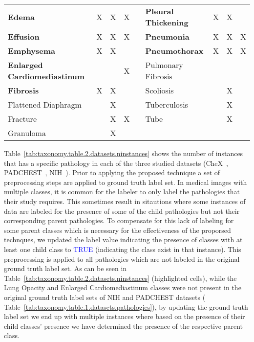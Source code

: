 \begin{table}[htbp]
{\begin{tabular}{lcccrlccc}
\cellcolor[HTML]{E9ECE6}\textbf{Edema} & \cellcolor[HTML]{E9ECE6}X & \cellcolor[HTML]{E9ECE6}X & \cellcolor[HTML]{E9ECE6}X &  & \textbf{Pleural Thickening} & X & X &  \\
\textbf{Effusion} & X & X & X &  & \cellcolor[HTML]{E9ECE6}\textbf{Pneumonia} & \cellcolor[HTML]{E9ECE6}X & \cellcolor[HTML]{E9ECE6}X & \cellcolor[HTML]{E9ECE6}X \\
\textbf{Emphysema} & X & X &  &  & \textbf{Pneumothorax} & X & X & X \\
\cellcolor[HTML]{E9ECE6}\textbf{Enlarged   Cardiomediastinum} & \cellcolor[HTML]{E9ECE6} & \cellcolor[HTML]{E9ECE6} & \cellcolor[HTML]{E9ECE6}X & \multicolumn{1}{l}{} & {Pulmonary Fibrosis} &  &  &  \\ 
\textbf{Fibrosis} & X & X &  &  & {Scoliosis} &  & X &  \\
{Flattened   Diaphragm} &  & X &  &  & {Tuberculosis} &  & X &  \\
{Fracture} &  & X & X &  & {Tube} &  & X &  \\
{Granuloma} &  & X &  &  &  & \multicolumn{1}{l}{} & \multicolumn{1}{l}{} & \multicolumn{1}{l}{}
\end{tabular}}
\end{table}

Table~\ref*{tab:taxonomy.table.2.datasets.ninstances} shows the number of instances that has a specific pathology in each of the three studied datasets (CheX~\cite{irvin_CheXpert_2019}, PADCHEST~\cite{bustos_Padchest_2020}, NIH~\cite{wang_ChestXRay8_2017}). Prior to applying the proposed technique a set of preprocessing steps are applied to ground truth label set. In medical images with multiple classes, it is common for the labeler to only label the pathologies that their study requires. This sometimes result in sitautions where some instances of data are labeled for the presence of some of the child pathologies but not their corresponding parent pathologies. To compensate for this lack of labeling for some parent classes which is necessary for the effectiveness of the proporsed technques, we updated the label value indicating the presence of classes with at least one child class to \textcolor{blue}{TRUE} (indicating the class exist in that instance). This preprocessing is applied to all pathologies which are not labeled in the original ground truth label set. As can be seen in Table~\ref{tab:taxonomy.table.2.datasets.ninstances} (\colorbox{mygreen}{highlighted cells}), while the Lung Opacity and Enlarged Cardiomediastinum classes were not present in the original ground truth label sets of NIH and PADCHEST datasets ( Table~\ref{tab:taxonomy.table.1.datasets.pathologies}), by updating the ground truth label set we end up with multiple instances where based on the presence of their child classes' presence we have determined the presence of the respective parent class.

